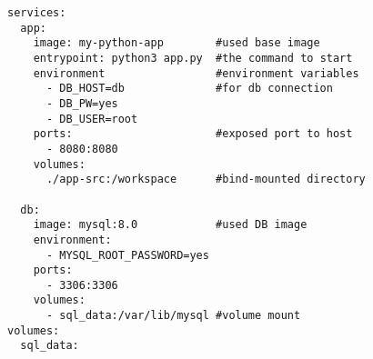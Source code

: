 
\begin{lstlisting}[language=docker-compose-2,caption={Exemplary Python Project \code{docker-compose.yml}},breaklines=true,label={code::compose_example}]
services:
  app:
    image: my-python-app        #used base image
    entrypoint: python3 app.py  #the command to start
    environment                 #environment variables
      - DB_HOST=db              #for db connection
      - DB_PW=yes
      - DB_USER=root
    ports:                      #exposed port to host
      - 8080:8080
    volumes:
      ./app-src:/workspace      #bind-mounted directory

  db:
    image: mysql:8.0            #used DB image
    environment:
      - MYSQL_ROOT_PASSWORD=yes
    ports:
      - 3306:3306
    volumes:
      - sql_data:/var/lib/mysql #volume mount
volumes:
  sql_data:
\end{lstlisting}
